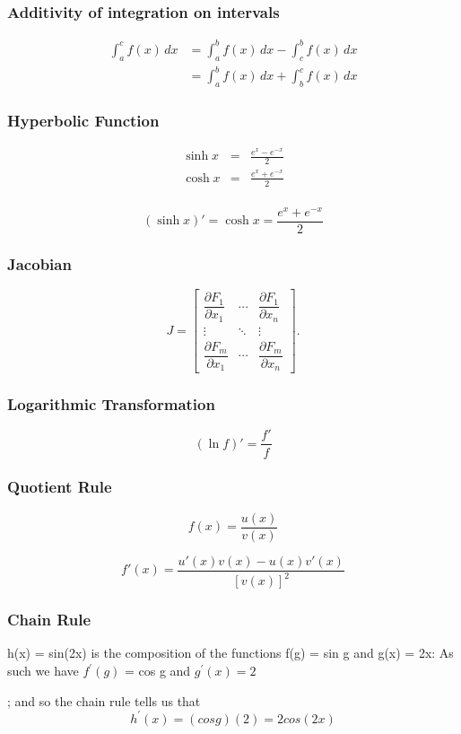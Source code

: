 \documentclass{beamer}
\begin{document}
			\begin{frame}
		\frametitle{Additivity of integration on intervals}
		\begin{eqnarray*}
			\int_a^c f(x) \, dx &{}= \int_a^b f(x) \, dx - \int_c^b f(x) \, dx \\
			&{} = \int_a^b f(x) \, dx + \int_b^c f(x) \, dx
		\end{eqnarray*}
			\end{frame}
			\begin{frame}
		\frametitle{Hyperbolic Function}
		
		\begin{eqnarray*}
			\sinh x  & =& \frac{e^x - e^{-x}}{2} \\
			\cosh x  & = & \frac{e^x + e^{-x}}{2} \\
		\end{eqnarray*}
		
		\[( \sinh x )'= \cosh x = \frac{e^x + e^{-x}}{2}\]
		
			\end{frame}
			\begin{frame}
		\frametitle{Jacobian}
		\[J=\begin{bmatrix} \dfrac{\partial F_1}{\partial x_1} & \cdots & \dfrac{\partial F_1}{\partial x_n} \\ \vdots & \ddots & \vdots \\ \dfrac{\partial F_m}{\partial x_1} & \cdots & \dfrac{\partial F_m}{\partial x_n}  \end{bmatrix}.\]
			\end{frame}
			\begin{frame}
		
		\frametitle{Logarithmic Transformation}
		\[ (\ln f)'= \frac{f'}{f}\]
			\end{frame}
			\begin{frame}
		\frametitle{Quotient Rule}
		
		\[f(x) = \frac{u(x)}{v(x)}\]
		
		
		\[f'(x) = \frac{u'(x)v(x) - u(x)v'(x)}{[v(x)]^2}\]
			\end{frame}
			\begin{frame}
		\frametitle{Chain Rule}
		
		h(x) = sin(2x) is the composition of the functions
		f(g) = sin g and g(x) = 2x:
		As such we have
		$f^{\prime}(g)$ = cos g and $g^{\prime}(x) = 2$
		
		;
		and so the chain rule tells us that
		\[h^{\prime}(x) = (cos g)(2) = 2 cos(2x)\]
			\end{frame}
		
\end{document}
